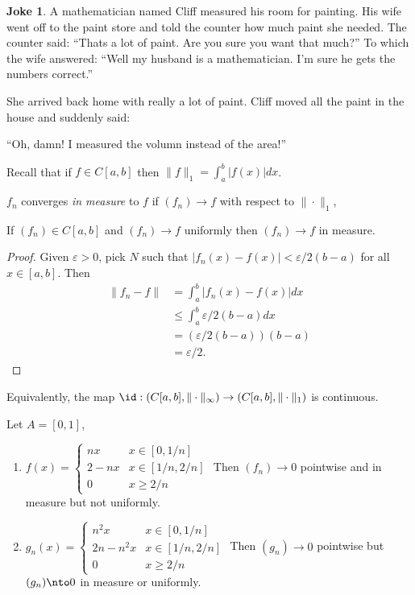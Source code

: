 \documentclass[a4paper]{article}
\theoremstyle{definition}
\newtheorem*{joke}{Joke}
\begin{document}
\begin{joke}
  A mathematician named Cliff measured his room for painting. His wife went off to the paint store and told the counter how much paint she needed. The counter said: ``Thats a lot of paint. Are you sure you want that much?'' To which the wife answered: ``Well my husband is a mathematician. I'm sure he gets the numbers correct.''

  She arrived back home with really a lot of paint. Cliff moved all the paint in the house and suddenly said:

  ``Oh, damn! I measured the volumn instead of the area!''
  \end{joke}

Recall that if \(f\in C[a,b]\) then \(\|f\|_1=\int_a^b|f(x)|dx\). 

\begin{definition}
  \(f_n\) converges \emph{in measure} to \(f\) if \((f_n)\to f\) with respect to \(\|\cdot\|_1\), 
\end{definition}

\begin{lemma}
  If \((f_n)\in C[a,b]\) and \((f_n)\to f\) uniformly then \((f_n)\to f\) in measure.
\end{lemma}

\begin{proof}
  Given \(\varepsilon>0\), pick \(N\) such that \(|f_n(x)-f(x)|<\varepsilon/2(b-a)\) for all \(x\in [a,b]\). Then
  \begin{align*}
    \|f_n-f\| &= \int_a^b |f_n(x)-f(x)| dx \\
              &\leq \int_a^b\varepsilon/2(b-a) dx \\
              &= (\varepsilon/2(b-a))(b-a) \\
              &= \varepsilon/2.
\end{align*}
\end{proof}

Equivalently, the map \(\id: (C[a,b], \|\cdot\|_\infty)\to (C[a,b], \|\cdot\|_1)\) is continuous.

\begin{eg}
  Let \(A=[0,1]\),
  \begin{enumerate}
  \item \(f(x) =
      \begin{cases}
        nx & x\in [0,1/n] \\ 2-nx & x\in [1/n,2/n] \\0 & x\geq2/n
      \end{cases}
  \)
  Then \((f_n)\to 0\) pointwise and in measure but not uniformly.
\item \(g_n(x) =
    \begin{cases}
      n^2 x & x\in [0,1/n]\\
      2n-n^2 x& x\in[1/n, 2/n] \\
      0 & x \geq 2/n
    \end{cases}
  \)
  Then \((g_n)\to 0\) pointwise but \((g_n)\nto 0\) in measure or uniformly.
  \end{enumerate}
\end{eg}
\end{document}
